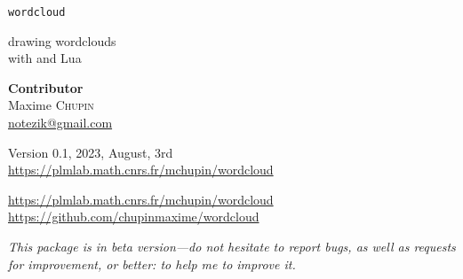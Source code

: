 \documentclass[english]{ltxdoc}
\begin{document}
\noindent
{\Huge \texttt{wordcloud}}\par\bigskip
\noindent
{\Large  drawing wordclouds \\[0.2cm]with  and Lua}\\[3cm]
\parbox{0.6\textwidth}{
}\hfill
\parbox{0.5\textwidth}{\Large\raggedleft
  \textbf{Contributor}\\
  Maxime \textsc{Chupin}\\
  \url{notezik@gmail.com}
}
\vfill
\begin{center}
  Version 0.1, 2023, August, 3rd \\
  \url{https://plmlab.math.cnrs.fr/mchupin/wordcloud}
\end{center}
\newpage


\begin{abstract}
  These  and  packages allows to draw
  wordclouds from a list of words and weights. The algorithm is implemented with
   whereas Lua is used to parse \LaTeX{} commands and to build
  the list of words and weights from a text file. 
  The  side require . 
\end{abstract}


\begin{center}
  \url{https://plmlab.math.cnrs.fr/mchupin/wordcloud}
  \url{https://github.com/chupinmaxime/wordcloud}
\end{center}

\tableofcontents

\bigskip

\begin{tcolorbox}[ arc=0pt,outer arc=0pt,
  colback=darkred!3,
  colframe=darkred,
  breakable,
  boxsep=0pt,left=5pt,right=5pt,top=5pt,bottom=5pt, bottomtitle =
  3pt, toptitle=3pt,
  boxrule=0pt,bottomrule=0.5pt,toprule=0.5pt, toprule at break =
  0pt, bottomrule at break = 0pt,]
  \itshape
  This package is in beta version---do not hesitate to report bugs, as well as
  requests for improvement, or better: to help me to improve it. 
\end{tcolorbox}
\end{document}
